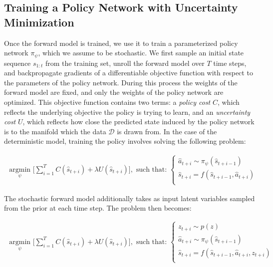 \documentclass{article} %
\begin{document}

\subsection{Training a Policy Network with Uncertainty Minimization}
\label{uncertainty-minimization}

Once the forward model is trained, we use it to train a parameterized policy network $\pi_\psi$, which we assume to be stochastic.
We first sample an initial state sequence $s_{1:t}$ from the training set, unroll the forward model over $T$ time steps, and backpropagate gradients of a differentiable objective function with respect to the parameters of the policy network.
During this process the weights of the forward model are fixed, and only the weights of the policy network are optimized.
This objective function contains two terms: a \textit{policy cost} $C$, which reflects the underlying objective the policy is trying to learn, and an \textit{uncertainty cost} $U$, which reflects how close the predicted state induced by the policy network is to the manifold which the data $\mathcal{D}$ is drawn from.
In the case of the deterministic model, training the policy involves solving the following problem:


    \begin{align*}
    \underset{\psi}{\mbox{ argmin }} \Big[ \sum_{i=1}^{T} C(\hat{s}_{t+i}) + \lambda U(\hat{s}_{t+i}) \Big],  \mbox{ such that: }
    \begin{cases}
      \hat{a}_{t+i} \sim \pi_\psi(\hat{s}_{t+i-1}) \\
      \hat{s}_{t+i} = f(\hat{s}_{t+i-1}, \hat{a}_{t+i}) \\
      \end{cases}
    \end{align*}

    The stochastic forward model additionally takes as input latent variables sampled from the prior at each time step. The problem then becomes:

        \begin{align*}
    \underset{\psi}{\mbox{ argmin }} \Big[ \sum_{i=1}^{T} C(\hat{s}_{t+i}) + \lambda U(\hat{s}_{t+i}) \Big],  \mbox{ such that: }
    \begin{cases}
      z_{t+i} \sim p(z) \\
      \hat{a}_{t+i} \sim \pi_\psi(\hat{s}_{t+i-1}) \\
      \hat{s}_{t+i} = f(\hat{s}_{t+i-1}, \hat{a}_{t+i}, z_{t+i}) \\
      \end{cases}
    \end{align*}
\end{document}
